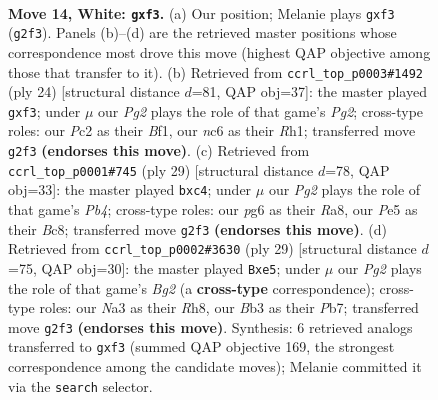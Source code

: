 \documentclass[11pt]{article}
\begin{document}
\clearpage

\begin{figure}[p]\centering
\begin{subfigure}{0.46\textwidth}\centering
\resizebox{\linewidth}{!}{%
\newchessgame
\chessboard[
  setfen={2kr2r1/ppp1ppbp/1nn3p1/4P3/7P/NB3b2/PPP2PP1/R1B1K1R1 w - - 0 14},
  showmover=false,
  pgfstyle=straightmove, color=movearrow, markmove={g2-f3}
]}
\caption{}
\end{subfigure}\hfill
\begin{subfigure}{0.46\textwidth}\centering
\resizebox{\linewidth}{!}{%
\newchessgame
\chessboard[
  setfen={r4rk1/ppp1bpp1/1nn4p/1N2P3/4P2P/P3Bb2/1P3PP1/R3KB1R w KQ - 0 13},
  showmover=false,
  pgfstyle=straightmove, color=movearrow, markmove={g2-f3}
]}
\caption{}
\end{subfigure}
\\[4pt]
\begin{subfigure}{0.46\textwidth}\centering
\resizebox{\linewidth}{!}{%
\newchessgame
\chessboard[
  setfen={r1b1nrk1/p3p1bp/2p1p1p1/1p6/2B5/P1N2N1P/1PPB1PP1/R4RK1 b - - 0 15},
  showmover=false,
  pgfstyle=straightmove, color=movearrow, markmove={b5-c4}
]}
\caption{}
\end{subfigure}\hfill
\begin{subfigure}{0.46\textwidth}\centering
\resizebox{\linewidth}{!}{%
\newchessgame
\chessboard[
  setfen={r1b4r/pp2kpb1/n1pp3p/4N1p1/2P5/2N3P1/PP1BPPBP/R2R2K1 b - - 0 15},
  showmover=false,
  pgfstyle=straightmove, color=movearrow, markmove={g7-e5}
]}
\caption{}
\end{subfigure}
\caption{\textbf{Move 14, White: \texttt{gxf3}.} (a) Our position; Melanie plays \texttt{gxf3} (\texttt{g2f3}). Panels (b)--(d) are the retrieved master positions whose correspondence most drove this move (highest QAP objective among those that transfer to it). (b) Retrieved from \texttt{ccrl\_top\_p0003\#1492} (ply 24) [structural distance $d$=81, QAP obj=37]: the master played \texttt{gxf3}; under $\mu$ our \emph{Pg2} plays the role of that game's \emph{Pg2}; cross-type roles: our \emph{P}c2 as their \emph{B}f1, our \emph{n}c6 as their \emph{R}h1; transferred move \texttt{g2f3} \textbf{(endorses this move)}. (c) Retrieved from \texttt{ccrl\_top\_p0001\#745} (ply 29) [structural distance $d$=78, QAP obj=33]: the master played \texttt{bxc4}; under $\mu$ our \emph{Pg2} plays the role of that game's \emph{Pb4}; cross-type roles: our \emph{p}g6 as their \emph{R}a8, our \emph{P}e5 as their \emph{B}c8; transferred move \texttt{g2f3} \textbf{(endorses this move)}. (d) Retrieved from \texttt{ccrl\_top\_p0002\#3630} (ply 29) [structural distance $d$=75, QAP obj=30]: the master played \texttt{Bxe5}; under $\mu$ our \emph{Pg2} plays the role of that game's \emph{Bg2} (a \textbf{cross-type} correspondence); cross-type roles: our \emph{N}a3 as their \emph{R}h8, our \emph{B}b3 as their \emph{P}b7; transferred move \texttt{g2f3} \textbf{(endorses this move)}. Synthesis: 6 retrieved analogs transferred to \texttt{gxf3} (summed QAP objective 169, the strongest correspondence among the candidate moves); Melanie committed it via the \texttt{search} selector.}
\label{fig:thought-m26}
\end{figure}
\end{document}
